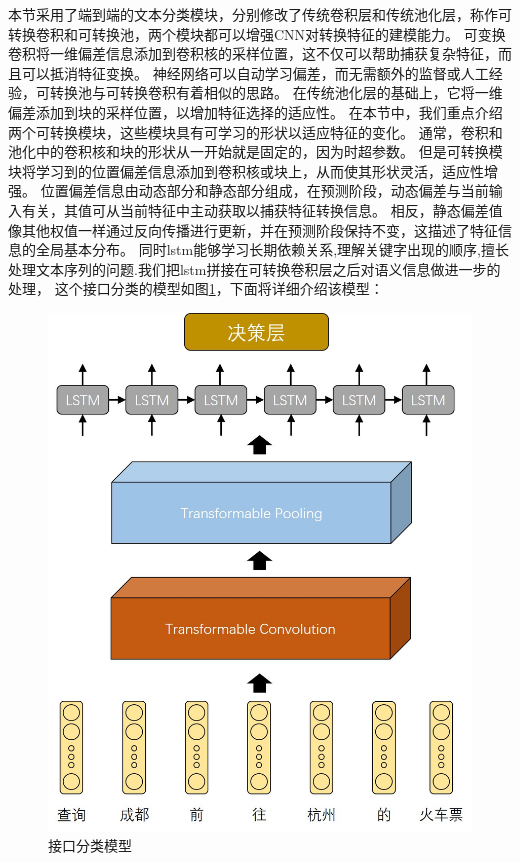 本节采用了端到端的文本分类模块，分别修改了传统卷积层和传统池化层，称作可转换卷积和可转换池，两个模块都可以增强CNN对转换特征的建模能力。
可变换卷积将一维偏差信息添加到卷积核的采样位置，这不仅可以帮助捕获复杂特征，而且可以抵消特征变换。
神经网络可以自动学习偏差，而无需额外的监督或人工经验，可转换池与可转换卷积有着相似的思路。
在传统池化层的基础上，它将一维偏差添加到块的采样位置，以增加特征选择的适应性。
在本节中，我们重点介绍两个可转换模块，这些模块具有可学习的形状以适应特征的变化。 
通常，卷积和池化中的卷积核和块的形状从一开始就是固定的，因为时超参数。 但是可转换模块将学习到的位置偏差信息添加到卷积核或块上，从而使其形状灵活，适应性增强。 
位置偏差信息由动态部分和静态部分组成，在预测阶段，动态偏差与当前输入有关，其值可从当前特征中主动获取以捕获特征转换信息。 
相反，静态偏差值像其他权值一样通过反向传播进行更新，并在预测阶段保持不变，这描述了特征信息的全局基本分布。
同时lstm能够学习长期依赖关系,理解关键字出现的顺序,擅长处理文本序列的问题.我们把lstm拼接在可转换卷积层之后对语义信息做进一步的处理，
这个接口分类的模型如图\ref{fig:tran-cnn-lstm}，下面将详细介绍该模型：

\begin{figure}[htbp]
  \centering
  \includegraphics[scale=0.5]{./images/tran-cnn-lstm.jpg}
  \caption{接口分类模型}
  \label{fig:tran-cnn-lstm}
\end{figure}

